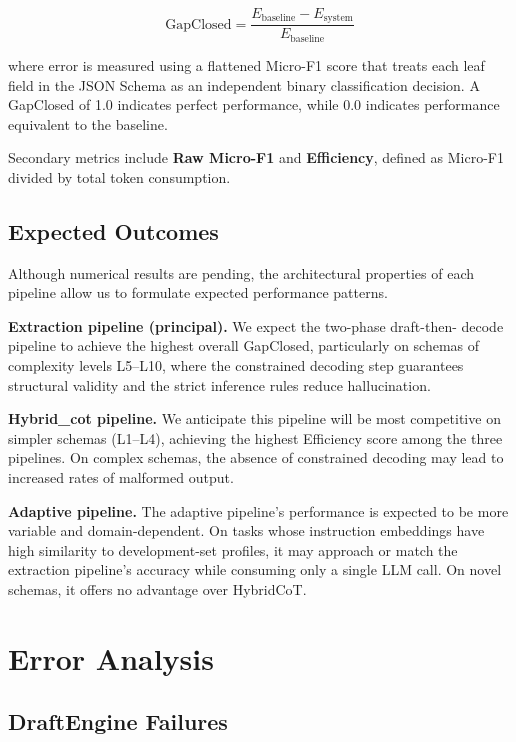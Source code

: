 \documentclass[onecolumn]{ceurart}
\begin{document}
\[
\text{GapClosed} = \frac{E_{\text{baseline}} - E_{\text{system}}}{E_{\text{baseline}}}
\]

where error is measured using a flattened Micro-F1 score that treats each leaf
field in the JSON Schema as an independent binary classification decision. A
GapClosed of 1.0 indicates perfect performance, while 0.0 indicates performance
equivalent to the baseline.

Secondary metrics include \textbf{Raw Micro-F1} and \textbf{Efficiency}, defined
as Micro-F1 divided by total token consumption.

\subsection{Expected Outcomes}

Although numerical results are pending, the architectural properties of each
pipeline allow us to formulate expected performance patterns.

\textbf{Extraction pipeline (principal).} We expect the two-phase draft-then-
decode pipeline to achieve the highest overall GapClosed, particularly on
schemas of complexity levels L5--L10, where the constrained decoding step
guarantees structural validity and the strict inference rules reduce
hallucination.

\textbf{Hybrid\_cot pipeline.} We anticipate this pipeline will be most
competitive on simpler schemas (L1--L4), achieving the highest Efficiency score
among the three pipelines. On complex schemas, the absence of constrained
decoding may lead to increased rates of malformed output.

\textbf{Adaptive pipeline.} The adaptive pipeline's performance is expected to
be more variable and domain-dependent. On tasks whose instruction embeddings
have high similarity to development-set profiles, it may approach or match the
extraction pipeline's accuracy while consuming only a single LLM call. On novel
schemas, it offers no advantage over HybridCoT.


\section{Error Analysis}
\label{sec:errors}

\subsection{DraftEngine Failures}
\end{document}
